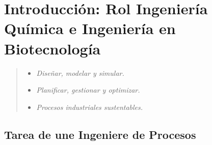 %
%


\section{Introducción: Rol Ingeniería Química e Ingeniería en Biotecnología}


    \begin{quote}
        \begin{itemize}
            \item \textit{Diseñar, modelar y simular.}
            \item \textit{Planificar, gestionar y optimizar.}
            \item \textit{Procesos industriales sustentables.}
        \end{itemize}
    \end{quote}

    \subsection{Tarea de une Ingeniere de Procesos}
    
